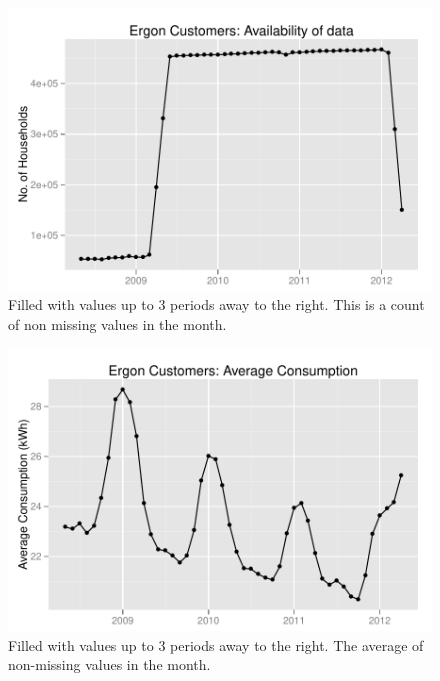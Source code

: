 \documentclass[a4paper,11pt]{article}
\begin{document}
\begin{figure}
\begin{center}
\includegraphics[width=1\textwidth]{figures/ErgonAvailDataFilled.pdf}
\caption{Filled with values up to 3 periods away to the right. This is a
count of non missing values in the month.}
\end{center}
\end{figure}

\begin{figure}
\begin{center}
\includegraphics[width=1\textwidth]{figures/ErgonAvgConsumpFilled.pdf}
\caption{Filled with values up to 3 periods away to the right. The average
of non-missing values in the month.}
\end{center}
\end{figure}
\end{document}
